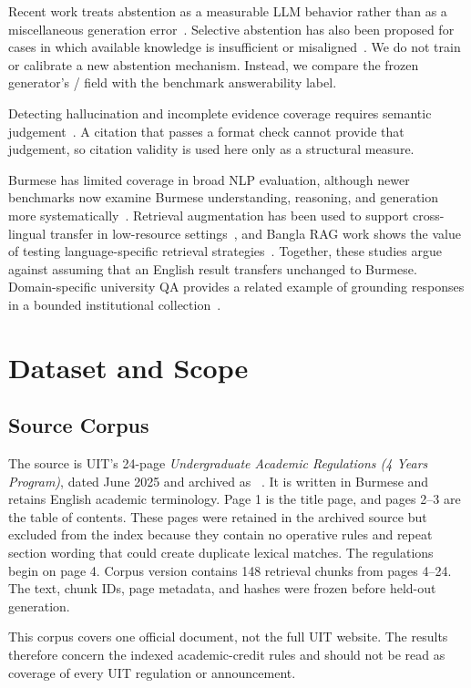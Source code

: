 \documentclass[a4paper,conference]{IEEEtran}
\newcommand{\code}[1]{\texttt{\detokenize{#1}}}
\begin{document}
Recent work treats abstention as a measurable LLM behavior rather than as a miscellaneous generation error~\cite{wen2025limits}. Selective abstention has also been proposed for cases in which available knowledge is insufficient or misaligned~\cite{huang2025abstention}. We do not train or calibrate a new abstention mechanism. Instead, we compare the frozen generator's \code{ANSWER}/\code{ABSTAIN} field with the benchmark answerability label.

Detecting hallucination and incomplete evidence coverage requires semantic judgement~\cite{chang2024hallucination}. A citation that passes a format check cannot provide that judgement, so citation validity is used here only as a structural measure.

Burmese has limited coverage in broad NLP evaluation, although newer benchmarks now examine Burmese understanding, reasoning, and generation more systematically~\cite{aung2026burmesesan}. Retrieval augmentation has been used to support cross-lingual transfer in low-resource settings~\cite{nie2023parc}, and Bangla RAG work shows the value of testing language-specific retrieval strategies~\cite{ipa2025trase}. Together, these studies argue against assuming that an English result transfers unchanged to Burmese. Domain-specific university QA provides a related example of grounding responses in a bounded institutional collection~\cite{sun2024universityrag}.

\section{Dataset and Scope}
\subsection{Source Corpus}
The source is UIT's 24-page \emph{Undergraduate Academic Regulations (4 Years Program)}, dated June 2025 and archived as \code{UIT-SRC-025}~\cite{uit2025regulations}. It is written in Burmese and retains English academic terminology. Page 1 is the title page, and pages 2--3 are the table of contents. These pages were retained in the archived source but excluded from the index because they contain no operative rules and repeat section wording that could create duplicate lexical matches. The regulations begin on page 4. Corpus version \code{UIT-AC-v1.1} contains 148 retrieval chunks from pages 4--24. The text, chunk IDs, page metadata, and hashes were frozen before held-out generation.

This corpus covers one official document, not the full UIT website. The results therefore concern the indexed academic-credit rules and should not be read as coverage of every UIT regulation or announcement.
\end{document}

